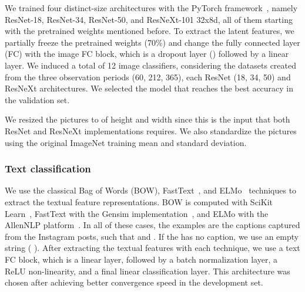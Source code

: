\documentclass[letterpaper]{article} \usepackage{aaai20}  \usepackage{times}  \usepackage{helvet} \usepackage{courier}  \usepackage[hyphens]{url}  \usepackage{graphicx} \urlstyle{rm} \def\UrlFont{\rm}  \usepackage{graphicx}  \frenchspacing  \setlength{\pdfpagewidth}{8.5in}  \setlength{\pdfpageheight}{11in}  \usepackage[final]{changes}
\begin{document}
We trained four distinct-size architectures with the PyTorch framework~\cite{paszke2017automatic}, namely ResNet-18, ResNet-34, ResNet-50, and ResNeXt-101 32x8d, all of them starting with the pretrained weights mentioned before. To extract the latent features, we partially freeze the pretrained weights (70\%) and change the fully connected layer (FC) with the image FC block, which is a dropout layer () followed by a linear layer. We induced a total of 12 image classifiers, considering the datasets created from the three observation periods (60, 212, 365), each ResNet (18, 34, 50) and ResNeXt architectures. We selected the model that reaches the best accuracy in the validation set. 

We resized the pictures to  of height and width since this is the input that both ResNet and ResNeXt implementations requires. We also standardize the pictures using the original ImageNet training mean and standard deviation. 

\subsubsection{Text classification} We use the classical Bag of Words (BOW), FastText~\cite{bojanowski2017enriching}, and ELMo~\cite{peters2018deep} techniques to extract the textual feature representations. BOW is computed with SciKit Learn~\cite{scikit-learn}, FastText with the Gensim implementation~\cite{rehurek_lrec}, and ELMo with the AllenNLP platform~\cite{Gardner2017AllenNLP}. In all of these cases, the examples are the captions captured from the Instagram posts, such that  and . If the  has no caption, we use an empty string ( \say{}). After extracting the textual features with each technique, we use a text FC block, which is a linear layer, followed by a batch normalization layer, a ReLU non-linearity, and a final linear classification layer. This architecture was chosen after achieving better convergence speed in the development set.
\end{document}
